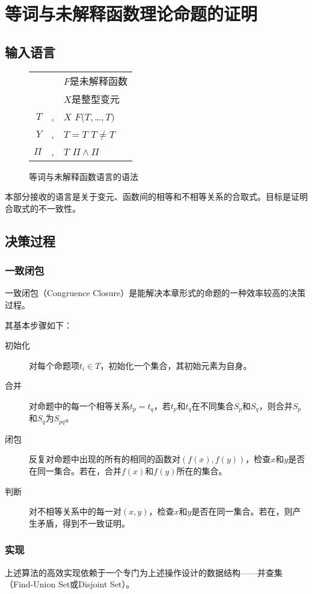 \chapter{等词与未解释函数理论命题的证明}
\label{chap:euf}

\section{输入语言}
\begin{figure}[!htbp]
  \centering
  \begin{tabular}[rcl]{rcl}
    & & $F$是未解释函数 \\
    & & $X$是整型变元 \\
    $T$ & \sep & $X$ \deli{} $F(T,$\ldots$,T)$ \\
    $Y$ & \sep{} & $T = T$ \deli{} $T \neq T$ \\
    $\Pi$ & \sep{} & $T$ \deli{} $\Pi \land \Pi$ \\
  \end{tabular}
  \caption{等词与未解释函数语言的语法}
  \label{euf:syntax}
\end{figure}
本部分接收的语言是关于变元、函数间的相等和不相等关系的合取式。目标是证明合取式的不一致性。

\section{决策过程}
\subsection{一致闭包}
一致闭包（Congruence Closure）\cite{Nelson80}是能解决本章形式的命题的一种效率较高的决策过程。

其基本步骤如下：
\begin{description}
\item[初始化] 对每个命题项$t_i \in T$，初始化一个集合，其初始元素为自身。
\item[合并] 对命题中的每一个相等关系$t_p = t_q$，若$t_p$和$t_q$在不同集合$S_p$和$S_q$，则合并$S_p$和$S_q$为$S_{pq}$。
\item[闭包] 反复对命题中出现的所有的相同的函数对$(f(x), f(y))$，检查$x$和$y$是否在同一集合。若在，合并$f(x)$和$f(y)$所在的集合。
\item[判断] 对不相等关系中的每一对$(x, y)$，检查$x$和$y$是否在同一集合。若在，则产生矛盾，得到不一致证明。
\end{description}

\subsection{实现}
上述算法的高效实现依赖于一个专门为上述操作设计的数据结构——并查集（Find-Union Set或Disjoint Set）。

